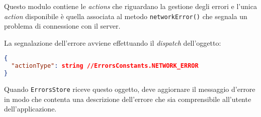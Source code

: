 Questo modulo contiene le \textit{actions} che riguardano la gestione degli errori e l'unica \textit{action} disponibile è quella associata al metodo \texttt{networkError()} che segnala un problema di connessione con il server.

La segnalazione dell'errore avviene effettuando il \textit{dispatch} dell'oggetto:
\begin{lstlisting}[language=JSON, caption=Action: network error]
{
  "actionType": string //ErrorsConstants.NETWORK_ERROR
}
\end{lstlisting}

Quando \texttt{ErrorsStore} riceve questo oggetto, deve aggiornare il messaggio d'errore in modo che contenta una descrizione dell'errore che sia comprensibile all'utente dell'applicazione.
